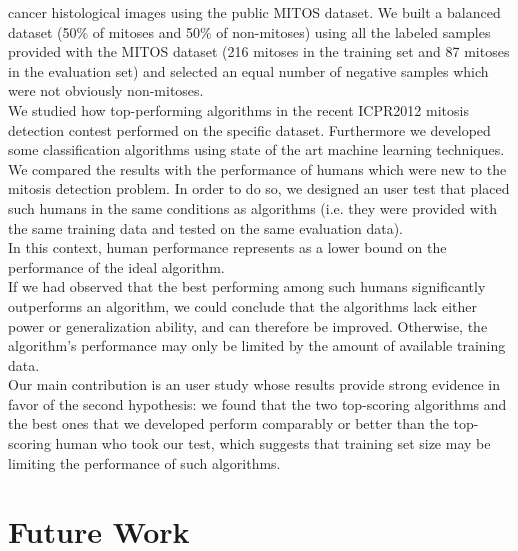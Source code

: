 cancer histological images using the public MITOS dataset. 
We built a balanced dataset (50\% of mitoses and 50\% of non-mitoses) using all the labeled samples provided with the MITOS dataset (216 mitoses in the training set and 87 mitoses in
the evaluation set) and selected an equal number of negative samples which were not obviously non-mitoses.\\
We studied how top-performing algorithms in the recent ICPR2012 mitosis detection contest performed on the specific dataset. Furthermore 
we developed some classification algorithms using state of the art machine learning techniques.\\
We compared the results with the performance of humans which were new to the mitosis detection problem.
In order to do so, we designed an user test that placed such humans in the same conditions
as algorithms (i.e. they were provided with the same training data and tested
on the same evaluation data).\\
In this context, human performance represents as a lower bound on the performance of the ideal algorithm.\\
If we had observed that the best performing among such humans significantly outperforms an algorithm, we could
conclude that the algorithms lack either power or generalization ability, and
can therefore be improved. Otherwise, the algorithm's performance may only be
limited by the amount of available training data.\\
Our main contribution is an user study whose results provide strong evidence in favor of the second hypothesis: we found that the two top-scoring algorithms
and the best ones that we developed perform comparably or better than the top-scoring human who took our test, which suggests that training set size may be limiting
the performance of such algorithms.

\vspace{0.5cm}

\section{Future Work}

